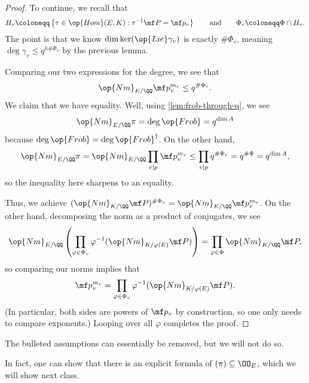 \documentclass[../notes.tex]{subfiles}
\begin{document}
\begin{proof}
	To continue, we recall that
	\[H_v\coloneqq\left\{\tau\in\op{Hom}(E,K):\tau^{-1}\mf P=\mf p_v\right\}\qquad\text{and}\qquad\Phi_v\coloneqq\Phi\cap H_v.\]
	The point is that we know $\dim\ker(\op{Lie}\gamma_v)$ is exactly $\#\Phi_v$, meaning $\deg\gamma_v\le q^{h\#\Phi_v}$ by the previous lemma.

	Comparing our two expressions for the degree, we see that
	\[\op{Nm}_{E/\QQ}\mf p_v^{m_v}\le q^{\#\Phi_v}.\]
	We claim that we have equality. Well, using \eqref{lem:frob-through-q}, we see
	\[\op{Nm}_{E/\QQ}\pi=\deg{\op{Frob}}=q^{\dim A}\]
	because $\deg{\op{Frob}}=\deg\op{Frob}^\dagger$. On the other hand,
	\[\op{Nm}_{E/\QQ}\pi=\op{Nm}_{E/\QQ}\prod_{v\mid p}\mf p_v^{m_v}\le\prod_{v\mid p}q^{\#\Phi_v}=q^{\#\Phi}=q^{\dim A},\]
	so the inequality here sharpens to an equality.
	
	Thus, we achieve $(\op{Nm}_{K/\QQ}\mf P)^{\#\Phi_v}=\op{Nm}_{E/\QQ}\mf p_v^{m_v}$. On the other hand, decomposing the norm as a product of conjugates, we see
	\[\op{Nm}_{E/\QQ}\left(\prod_{\varphi\in\Phi_v}\varphi^{-1}(\op{Nm}_{K/\varphi(E)}\mf P)\right)=\prod_{\varphi\in\Phi}\op{Nm}_{K/\QQ}\mf P,\]
	so comparing our norms implies that
	\[\mf p_v^{m_v}=\prod_{\varphi\in\Phi_v}\varphi^{-1}(\op{Nm}_{K/\varphi(E)}\mf P).\]
	(In particular, both sides are powers of $\mf p_v$ by construction, so one only needs to compare exponents.) Looping over all $\varphi$ completes the proof.
\end{proof}
\begin{remark}
	The bulleted assumptions can essentially be removed, but we will not do so.
\end{remark}
\begin{remark}
	In fact, one can show that there is an explicit formula of $(\pi)\subseteq\OO_E$, which we will show next class.
\end{remark}
\end{document}
